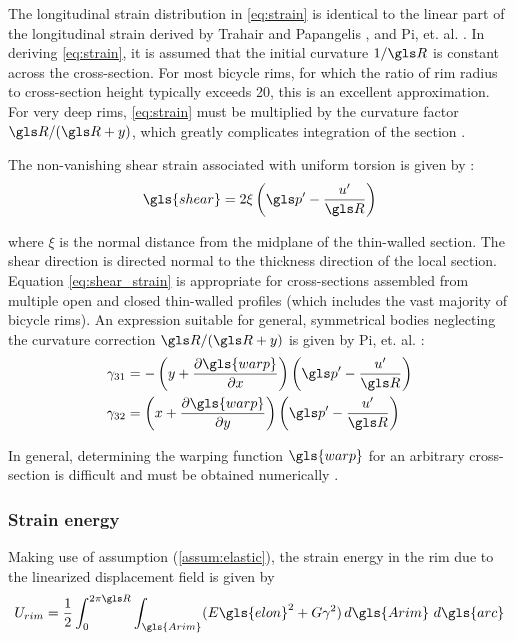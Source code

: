 \documentclass[\rootdir/thesis.tex]{subfiles}
\begin{document}
The longitudinal strain distribution in \eqref{eq:strain} is identical to the linear part of the longitudinal strain derived by Trahair and Papangelis \cite{Trahair1987}, and Pi, et. al. \cite{Pi1995}. In deriving \eqref{eq:strain}, it is assumed that the initial curvature $1/\R$ is constant across the cross-section. For most bicycle rims, for which the ratio of rim radius to cross-section height typically exceeds 20, this is an excellent approximation. For very deep rims, \eqref{eq:strain} must be multiplied by the curvature factor $\R/(\R+\y)$, which greatly complicates integration of the section \cite{Kang1994,Lim2004,Ryu2012}.

The non-vanishing shear strain associated with uniform torsion is given by \cite{Pi1995,Kang1994}:
\begin{equation}
\label{eq:shear_strain}
\gls{shear} = 2 \xi \left(\p' - \frac{u'}{\R}\right)
\end{equation}

where $\xi$ is the normal distance from the midplane of the thin-walled section. The shear direction is directed normal to the thickness direction of the local section. Equation \eqref{eq:shear_strain} is appropriate for cross-sections assembled from multiple open and closed thin-walled profiles (which includes the vast majority of bicycle rims). An expression suitable for general, symmetrical bodies neglecting the curvature correction $\R/(\R+\y)$ is given by Pi, et. al. \cite{Bradford2006b}:
\begin{subequations}
\begin{align}
\gamma_{31} &= -\left(\y + \frac{\partial \gls{warp}}{\partial \x}\right)\left(\p' - \frac{u'}{\R}\right)\\
\gamma_{32} &= \left(\x + \frac{\partial \gls{warp}}{\partial \y}\right)\left(\p' - \frac{u'}{\R}\right)
\end{align}
\end{subequations}

In general, determining the warping function $\gls{warp}$ for an arbitrary cross-section is difficult and must be obtained numerically \cite{Timoshenko1961}.


\subsubsection{Strain energy}
Making use of assumption (\ref{assum:elastic}), the strain energy in the rim due to the linearized displacement field is given by
\begin{equation}
\label{eq:U_rim_gen}
U_{rim} = \frac{1}{2}\int_0^{2\pi \R} \int_{\gls{Arim}} (\E\gls{elon}^2 + \G\gamma^2) \,d\gls{Arim}\,\, d\gls{arc}
\end{equation}
\end{document}
